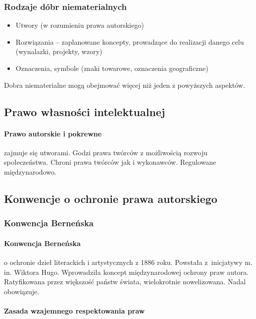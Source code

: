 \documentclass{article}
\begin{document}
\subsubsection{Rodzaje dóbr niematerialnych}

\begin{itemize}
  \item Utwory (w rozumieniu prawa autorskiego)
  \item Rozwiązania -- zaplanowane koncepty, prowadzące do realizacji danego celu (wynalazki, projekty, wzory)
  \item Oznaczenia, symbole (znaki towarowe, oznaczenia geograficzne)
\end{itemize}

Dobra niematerialne mogą obejmować więcej niż jeden z powyższych aspektów.

\subsection{Prawo własności intelektualnej}

\paragraph{Prawo autorskie i pokrewne}

zajmuje się utworami. Godzi prawa twórców z możliwością rozwoju społeczeństwa. Chroni prawa twórców jak i wykonawców. Regulowane międzynarodowo.

\subsection{Konwencje o ochronie prawa autorskiego}

\subsubsection{Konwencja Berneńska}

\paragraph{Konwencja Berneńska}

o ochronie dzieł literackich i artystycznych z 1886 roku. Powstała z~inicjatywy m. in. Wiktora Hugo.
Wprowadziła koncept międzynarodowej ochrony praw autora.
Ratyfikowana przez większość państw świata, wielokrotnie nowelizowana. Nadal obowiązuje.

\paragraph{Zasada wzajemnego respektowania praw}
\end{document}
